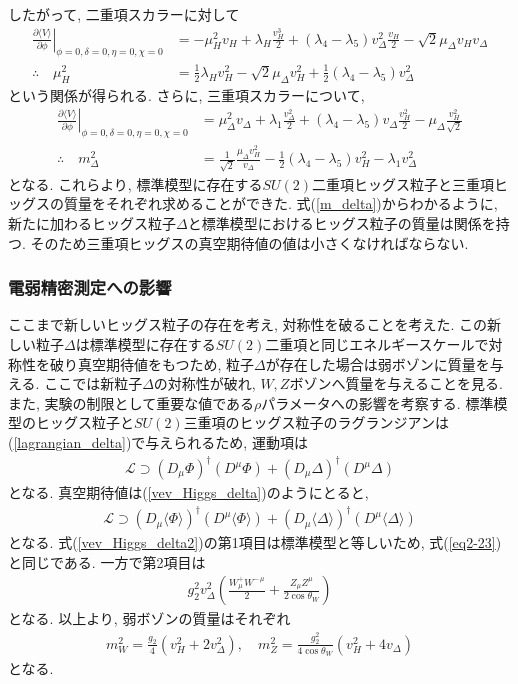 したがって, 二重項スカラーに対して
\begin{align}
  \left.\frac{\partial \langle V\rangle}{\partial \phi}\right|_{\phi=0, \delta=0, \eta=0, \chi=0} &= -\mu_H^2 v_H + \lambda_H \frac{v_H^3}{2} + (\lambda_4-\lambda_5)v_\Delta^2\frac{v_H}{2}-\sqrt{2}\mu_\Delta v_H v_\Delta\nonumber\\
    \therefore\quad\mu_H^2 &= \frac{1}{2}\lambda_H v_H^2 -\sqrt{2}\mu_\Delta v_H^2 +\frac{1}{2}(\lambda_4 - \lambda_5)v_\Delta^2
\end{align}
という関係が得られる.
さらに, 三重項スカラーについて, 
\begin{align}
  \left.\frac{\partial \langle V\rangle}{\partial \phi}\right|_{\phi=0, \delta=0, \eta=0, \chi=0} &= \mu_\Delta^2 v_\Delta + \lambda_1 \frac{v_\Delta^2}{2} + (\lambda_4-\lambda_5)v_\Delta\frac{v_H^2}{2}-\mu_\Delta\frac{v_H^2}{\sqrt{2}}\nonumber\\
    \therefore \quad m_\Delta^2 &= \frac{1}{\sqrt{2}}\frac{\mu_\Delta v_H^2}{v_\Delta} - \frac{1}{2}(\lambda_4 - \lambda_5)v_H^2 -\lambda_1 v_\Delta^2\label{m_delta}
\end{align}
となる.
これらより, 標準模型に存在する$SU(2)$二重項ヒッグス粒子と三重項ヒッグスの質量をそれぞれ求めることができた.
式(\ref{m_delta})からわかるように, 新たに加わるヒッグス粒子$\Delta$と標準模型におけるヒッグス粒子の質量は関係を持つ.
そのため三重項ヒッグスの真空期待値の値は小さくなければならない.

\subsubsection{電弱精密測定への影響}
ここまで新しいヒッグス粒子の存在を考え, 対称性を破ることを考えた.
この新しい粒子$\Delta$は標準模型に存在する$SU(2)$二重項と同じエネルギースケールで対称性を破り真空期待値をもつため, 粒子$\Delta$が存在した場合は弱ボゾンに質量を与える.
ここでは新粒子$\Delta$の対称性が破れ, $W, Z$ボゾンへ質量を与えることを見る.
また, 実験の制限として重要な値である$\rho$パラメータへの影響を考察する.
標準模型のヒッグス粒子と$SU(2)$三重項のヒッグス粒子のラグランジアンは(\ref{lagrangian_delta})で与えられるため, 運動項は
\begin{align}
  \mathcal{L} \supset (D_\mu\Phi)^\dagger (D^\mu \Phi) + (D_\mu \Delta)^\dagger (D^\mu \Delta)
\end{align}
となる.
真空期待値は(\ref{vev_Higgs_delta})のようにとると,
\begin{align}
  \mathcal{L} \supset (D_\mu\langle\Phi\rangle)^\dagger (D^\mu \langle\Phi\rangle) + (D_\mu \langle\Delta\rangle)^\dagger (D^\mu \langle \Delta\rangle)\label{vev_Higgs_delta2}
\end{align}
となる.
式(\ref{vev_Higgs_delta2})の第1項目は標準模型と等しいため, 式(\ref{eq2-23})と同じである.
一方で第2項目は
\begin{align}
  g_2^2 v_\Delta^2 \left( \frac{W_\mu^+ W^{-\,\mu}}{2} + \frac{Z_\mu Z^\mu}{2\cos\theta_W}\right)
\end{align}
となる.
以上より, 弱ボゾンの質量はそれぞれ
\begin{align}
  m_W^2 = \frac{g_2}{4}\left(v_H^2 + 2v_\Delta^2\right),\quad m_Z^2 = \frac{g_2^2}{4\cos\theta_W}\left(v_H^2 + 4v_\Delta\right)
\end{align}
となる.

